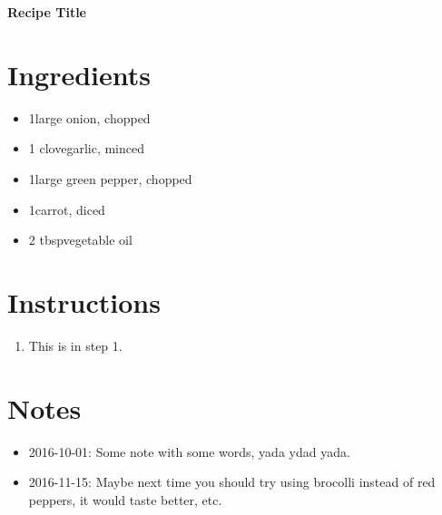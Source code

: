 \documentclass{article}
\begin{document}
\pagestyle{fancy}
\fancyhead{}
\fancyfoot{}
\renewcommand{\thefilemoddate}[3]{\formatdate{#3}{#2}{#1}}
\lfoot{\filemodprintdate{\jobname}}
\renewcommand{\headrulewidth}{0pt}

\centering\textbf {\Huge Recipe Title} \\
\raggedright

\section*{Ingredients}
\TabPositions{0.75in} %
\begin{itemize}
  \item 1\tab large onion, chopped
  \item 1 clove\tab	garlic, minced
  \item 1\tab	large green pepper, chopped
  \item 1\tab	carrot, diced
  \item 2 tbsp\tab vegetable oil
\end{itemize}

\section*{Instructions}
\begin{enumerate}
  \item This is in step 1.
\end{enumerate}

\section*{Notes}
\begin{itemize}
  \item 2016-10-01: Some note with some words, yada ydad yada.
  \item 2016-11-15: Maybe next time you should try using brocolli instead of red
    peppers, it would taste better, etc.
\end{itemize}
\end{document}
